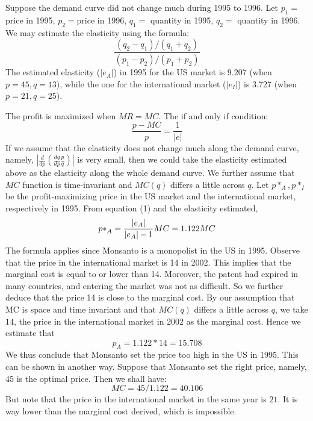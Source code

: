 \documentclass[a4paper]{article}
\begin{document}
    \begin{answer}[Q2]
    Suppose the demand curve did not change much during 1995 to 1996.
    Let $p_1 =$ price in 1995, $p_2 =$price in 1996, $q_1 =$ quantity in 1995, $q_2 = $ quantity in 1996. 
    We may estimate the elasticity using the formula:
    \begin{equation*}
        \frac{(q_2-q_1)/(q_1+q_2)}{(p_1-p_2)/(p_1+p_2)}
    \end{equation*}
    The estimated elasticity ($|e_A|$) in 1995 for the US market is $9.207$ (when $p= 45, q = 13$), while the one for the international market ($|e_I|$) is 3.727 (when $p = 21, q = 25$). 
    
    The profit is maximized when $MR = MC$. 
    The if and only if condition:
    \begin{equation}
        \frac{p-MC}{p} = \frac{1}{|e|}
    \end{equation}
    If we assume that the elasticity does not change much along the demand curve, namely, 
       $\left| \frac{d}{dp} \left(\frac{dq}{dp}\frac{p}{q}\right) \right|$
    is very small, 
    then we could take the elasticity estimated above as the elasticity along the whole demand curve.
    We further assume that $MC$ function is time-invariant and $MC(q)$ differs a little across $q$.
    Let $p*_A, p*_I$ be the profit-maximizing price in the US market and the international market, respectively in 1995. 
    From equation (1) and the elasticity estimated, 
    \begin{equation*}
        {p*}_A = \frac{|e_A|}{|e_A|-1}MC = 1.122 MC \\
    \end{equation*}
    The formula applies since Monsanto is a monopolist in the US in 1995. Observe that the price in the international market is 14 in 2002. This implies that the marginal cost is equal to or lower than 14. Moreover, the patent had expired in many countries, and entering the market was not as difficult. So we further deduce that the price 14 is close to the marginal cost. By our assumption that MC is space and time invariant and that $MC(q)$ differs a little across $q$, we take $14$, the price in the international market in 2002 as the marginal cost. Hence we estimate that 
    \begin{equation*}
        p_A = 1.122 * 14 = 15.708
    \end{equation*}
    We thus conclude that Monsanto set the price too high in the US in 1995. This can be shown in another way. Suppose that Monsanto set the right price, namely, $45$ is the optimal price. Then we shall have:
    \begin{equation*}
        MC = 45 / 1.122 = 40.106
    \end{equation*}
    But note that the price in the international market in the same year is $21$. It is way lower than the marginal cost derived, which is impossible. 
    

\end{answer}
\end{document}
